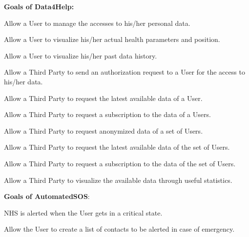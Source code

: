 \textbf{Goals of Data4Help:}
\begin{enumerate}[label={[}G3.\arabic*{]}]

    \item \label{goal:user1}Allow a User to manage the accesses to his/her personal data.
    \item \label{goal:user2}Allow a User to visualize his/her actual health parameters and position.
    \item \label{goal:user3}Allow a User to visualize his/her past data history.

    \item \label{goal:parties1}Allow a Third Party to send an authorization request to a User for the access to his/her data.
    
    \begin{enumerate}[label={[}G3.4.\arabic*{]}]
        \item \label{goal:parties2}Allow a Third Party to  request the latest available data of a User.
        \item \label{goal:parties3}Allow a Third Party to request a subscription to the data of a Users.
    \end{enumerate}

    \item \label{goal:parties4}Allow a Third Party to request anonymized data of a set of Users.
    
     \begin{enumerate}[label={[}G3.5.\arabic*{]}]
        \item \label{goal:parties5}Allow a Third Party to request the latest available data of the set of Users.
        \item \label{goal:parties6}Allow a Third Party to request a subscription to the data of the set of Users.
    \end{enumerate}
    
    \item \label{goal:parties7}Allow a Third Party to visualize the available data through useful statistics.
    \newline
    
\end{enumerate}

\textbf{Goals of AutomatedSOS}:
\begin{enumerate}[label={[}G4.\arabic*{]}]

\item \label{goal:sos1}NHS is alerted when the User gets in a critical state.
\item \label{goal:sos2}Allow the User to create a list of contacts to be alerted in case of emergency.
    
\end{enumerate}

